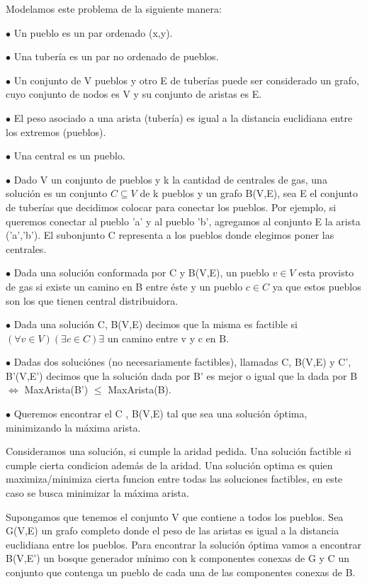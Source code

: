Modelamos este problema de la siguiente manera:

$\bullet$ Un pueblo es un par ordenado (x,y).

$\bullet$ Una tubería es un par no ordenado de pueblos.

$\bullet$ Un conjunto de V pueblos y otro E de tuberías puede ser considerado un grafo, cuyo conjunto de nodos es V y su conjunto de aristas es E.

$\bullet$ El peso asociado a una arista (tubería) es igual a la distancia euclidiana entre los extremos (pueblos).

$\bullet$ Una central es un pueblo.

$\bullet$ Dado V un conjunto de pueblos y k la cantidad de centrales de gas, una solución es un conjunto $C \subseteq V$ de k pueblos y un grafo B(V,E), sea E el conjunto de tuberías que decidimos colocar para conectar los pueblos. Por ejemplo, si queremos conectar al pueblo 'a' y al pueblo 'b', agregamos al conjunto E la arista ('a','b'). El subonjunto C representa a los pueblos donde elegimos poner las centrales.  

$\bullet$ Dada una solución conformada por C y B(V,E), un pueblo $v \in V$ esta provisto de gas si existe un camino en B entre éste y un pueblo $c \in C$ ya que estos pueblos son los que tienen central distribuidora.

$\bullet$ Dada una solución C, B(V,E) decimos que la misma es factible si $(\forall v \in V)(\exists c \in C) \exists$ un camino entre v y c en B. 

$\bullet$ Dadas dos soluciónes (no necesariamente factibles), llamadas C, B(V,E) y C', B'(V,E') decimos que la solución dada por B' es mejor o igual que la dada por B $\Leftrightarrow$ MaxArista(B') $\leq$ MaxArista(B).

$\bullet$ Queremos encontrar el C , B(V,E) tal que sea una solución óptima, minimizando la máxima arista.

Consideramos una solución, si cumple la aridad pedida. Una solución factible si cumple cierta condicion además de la aridad. Una solución optima es quien maximiza/minimiza cierta funcion entre todas las soluciones factibles, en este caso se busca minimizar la máxima arista.

Supongamos que tenemos el conjunto V que contiene a todos los pueblos. Sea G(V,E) un grafo completo donde el peso de las aristas es igual a la distancia euclidiana entre los pueblos. Para encontrar la solución óptima vamos a encontrar B(V,E') un bosque generador mínimo con k componentes conexas de G y C un conjunto que  contenga un pueblo de cada una de las componentes conexas de B.

